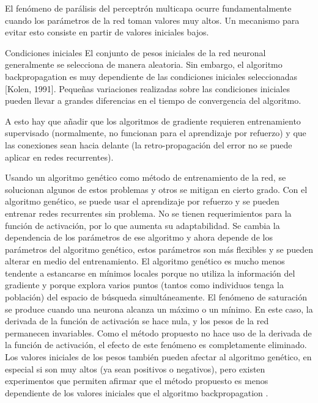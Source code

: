 \documentclass[11pt]{article}
\begin{document}
\begin{titlepage}
\begin{listaDefiniciones}
 El fen\'omeno de par\'alisis del perceptr\'on multicapa ocurre fundamentalmente cuando los par\'ametros de la red toman valores muy altos. Un mecanismo para evitar esto consiste en partir de valores iniciales bajos.

\item[Condiciones iniciales] El conjunto de pesos iniciales de la red neuronal generalmente se selecciona de manera aleatoria. Sin embargo, el algoritmo backpropagation es muy dependiente de las condiciones iniciales seleccionadas [Kolen, 1991]. Peque\~nas variaciones realizadas sobre las condiciones iniciales pueden llevar a grandes diferencias en el tiempo de convergencia del algoritmo.
\end{listaDefiniciones}

 A esto hay que a\~nadir que los algoritmos de gradiente requieren entrenamiento supervisado (normalmente, no funcionan para el aprendizaje por refuerzo) y que las conexiones sean hacia delante (la retro-propagaci\'on del error no se puede aplicar en redes recurrentes). 

 Usando un algoritmo gen\'etico como m\'etodo de entrenamiento de la red, se solucionan algunos de estos problemas y otros se mitigan en cierto grado. Con el algoritmo gen\'etico, se puede usar el aprendizaje por refuerzo y se pueden entrenar redes recurrentes sin problema. No se tienen requerimientos para la funci\'on de activaci\'on, por lo que aumenta su adaptabilidad. Se cambia la dependencia de los par\'ametros de ese algoritmo y ahora depende de los par\'ametros del algoritmo gen\'etico, estos par\'ametros son m\'as flexibles y se pueden alterar en medio del entrenamiento. El algoritmo gen\'etico es mucho menos tendente a estancarse en m\'inimos locales porque no utiliza la informaci\'on del gradiente y porque explora varios puntos (tantos como individuos tenga la poblaci\'on) del espacio de b\'usqueda simult\'aneamente. El fen\'omeno de saturaci\'on se produce cuando una neurona alcanza un m\'aximo o un m\'inimo. En este caso, la derivada de la funci\'on de activaci\'on se hace nula, y los pesos de la red permanecen invariables. Como el m\'etodo propuesto no hace uso de la derivada de la funci\'on de activaci\'on, el efecto de este fen\'omeno es completamente eliminado. Los valores iniciales de los pesos tambi\'en pueden afectar al algoritmo gen\'etico, en especial si son muy altos (ya sean positivos o negativos), pero existen experimentos que permiten afirmar que el m\'etodo propuesto es menos dependiente de los valores iniciales que el algoritmo backpropagation \cite[Bertona2005]{Bertona2005}.

\end{titlepage}
\end{document}
